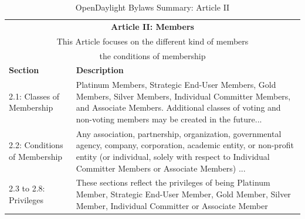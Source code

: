 \documentclass[a4paper, 12pt]{book}
\begin{document}
\begin{table}[H]
  \begin{center}
    \begin{tabular}{ | p{4cm} | p{11cm} | }
    \toprule
    \multicolumn {2}{|c|}{\textbf{Article II: Members}} \\
    \multicolumn {2}{|c|}{This Article focuses on the different kind of members} \\
    \multicolumn {2}{|c|}{the conditions of membership} \\
    \hline
    \textbf{Section} & \textbf{Description} \\
    \hline
    2.1: Classes of Membership & Platinum Members, Strategic End-User Members, Gold Members, Silver Members, Individual Committer Members, and Associate Members. Additional classes of voting and non-voting members may be created in the future...\\
    \hline
    2.2: Conditions of Membership & Any association, partnership, organization, governmental agency, company, corporation, academic entity, or non-profit entity (or individual, solely with respect to Individual Committer Members or Associate Members) ...\\
    \hline
    2.3 to 2.8: Privileges & These sections reflect the privileges of being Platinum Member, Strategic End-User Member, Gold Member, Silver Member, Individual Committer or Associate Member\\
    \bottomrule
    \end{tabular}
    \caption{OpenDaylight Bylaws Summary: Article II}
    \label{tab:odlbylaws-art02}
  \end{center}
\end{table}
\end{document}
